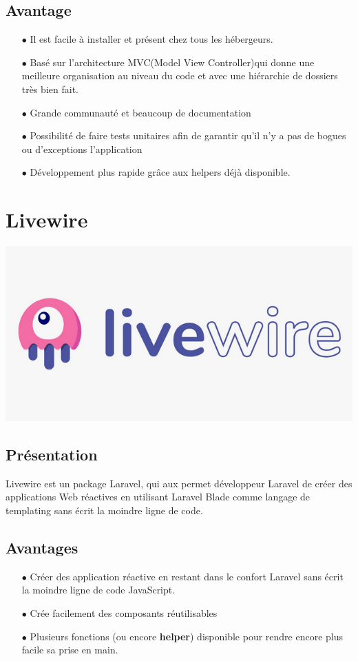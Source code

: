 			\subsection*{Avantage}
				\begin{itemize}
					\item[$\bullet$] Il est facile à installer et présent chez tous les hébergeurs.
					\item[$\bullet$] Basé sur l'architecture MVC(Model View Controller)qui donne une meilleure organisation au niveau du code et avec une hiérarchie de dossiers très bien fait.
					\item[$\bullet$] Grande communauté et beaucoup de documentation
					\item[$\bullet$] Possibilité de faire tests unitaires afin de garantir qu’il n’y a pas de bogues ou d’exceptions l'application
					\item[$\bullet$] Développement plus rapide grâce aux helpers déjà disponible.
				\end{itemize}
			\section*{Livewire}
				\begin{center}
					\includegraphics[scale=0.6]{chap_2/livewire.png}
					\label{logo de livewire}
					\cite{logo_livewire}
				\end{center}
				\subsection*{Présentation}
					Livewire est un package Laravel, qui aux permet développeur Laravel de créer des applications Web réactives en utilisant Laravel Blade comme langage de templating sans écrit la moindre ligne de code.
					
				\subsection*{Avantages}
				\begin{itemize}
					\item[$\bullet$] Créer des application réactive en restant dans le confort Laravel sans écrit la moindre ligne de code JavaScript.
					\item[$\bullet$] Crée facilement des composants réutilisables
					\item[$\bullet$] Plusieurs fonctions (ou encore \textbf{helper}) disponible pour rendre encore plus facile sa prise en main.
				\end{itemize}
			
